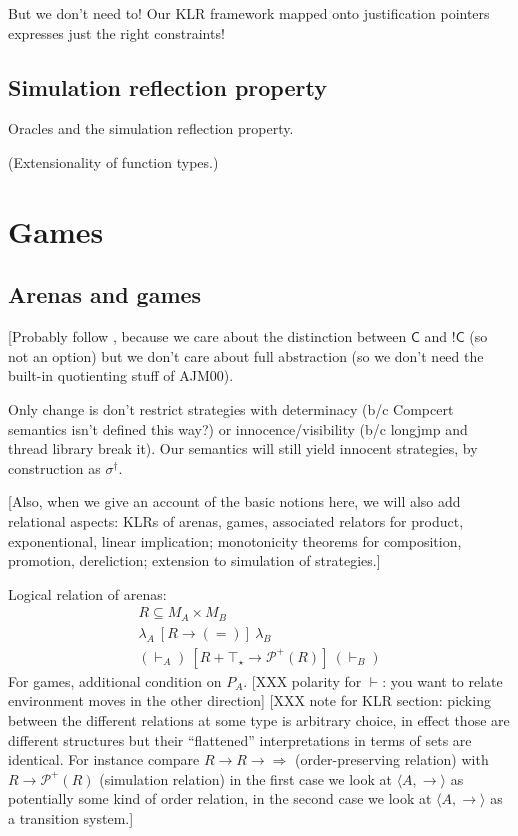 \documentclass[acmsmall,anonymous]{acmart}
\newcommand{\kw}[1]{\ensuremath{ \textsf{#1} }}
\newcommand{\ifr}[1]{\ [{#1}]\ }
\newcommand{\EC}{\kw{C}}
\begin{document}
But we don't need to!
Our KLR framework
mapped onto justification pointers
expresses just the right constraints!


\subsection{Simulation reflection property} %

Oracles and the simulation reflection property.

(Extensionality of function types.)



\newpage
\section{Games} %

\subsection{Arenas and games} %

[Probably follow \citep{gamesem99},
because we care about the distinction between $\EC$ and $!\EC$
(so \citep{gref98} not an option)
but we don't care about full abstraction
(so we don't need the built-in quotienting stuff of AJM00).

Only change is don't restrict strategies
with determinacy (b/c Compcert semantics isn't defined this way?)
or innocence/visibility (b/c longjmp and thread library break it).
Our semantics will still yield innocent strategies,
by construction as $\sigma^\dagger$.

[Also, when we give an account of the basic notions here,
we will also add relational aspects:
KLRs of arenas, games,
associated relators for product, exponentional, linear implication;
monotonicity theorems for composition, promotion, dereliction;
extension to simulation of strategies.]

Logical relation of arenas:
\begin{gather*}
    R \subseteq M_A \times M_B \\
    \lambda_A \ifr{R \rightarrow (=)} \lambda_B \\
    (\vdash_A) \ifr{R + \top_\star \rightarrow \mathcal{P}^+(R)} (\vdash_B)
\end{gather*}
For games, additional condition on $P_A$.
[XXX polarity for $\vdash$: you want to relate environment moves
in the other direction]
[XXX note for KLR section: picking between
the different relations at some type is arbitrary choice,
in effect those are different structures
but their ``flattened'' interpretations in terms of sets are identical.
For instance compare $R \rightarrow R \rightarrow \Rightarrow$
(order-preserving relation)
with $R \rightarrow \mathcal{P}^+(R)$
(simulation relation)
in the first case we look at $\langle A, \rightarrow \rangle$
as potentially some kind of order relation,
in the second case we look at $\langle A, \rightarrow \rangle$
as a transition system.]
\end{document}
